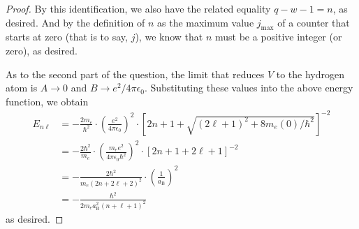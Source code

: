 \documentclass[../psets.tex]{subfiles}
\begin{document}
\begin{enumerate}
\begin{enumerate}
\begin{proof}
            By this identification, we also have the related equality $q-w-1=n$, as desired. And by the definition of $n$ as the maximum value $j_\text{max}$ of a counter that starts at zero (that is to say, $j$), we know that $n$ must be a positive integer (or zero), as desired.\par
            As to the second part of the question, the limit that reduces $V$ to the hydrogen atom is $A\to 0$ and $B\to e^2/4\pi\epsilon_0$. Substituting these values into the above energy function, we obtain
            \begin{align*}
                E_{n\ell} &= -\frac{2m_e}{\hbar^2}\cdot\left( \frac{e^2}{4\pi\epsilon_0} \right)^2\cdot\left[ 2n+1+\sqrt{(2\ell+1)^2+8m_e(0)/\hbar^2} \right]^{-2}\\
                &= -\frac{2\hbar^2}{m_e}\cdot\left( \frac{m_ee^2}{4\pi\epsilon_0\hbar^2} \right)^2\cdot\left[ 2n+1+2\ell+1 \right]^{-2}\\
                &= -\frac{2\hbar^2}{m_e(2n+2\ell+2)^2}\cdot\left( \frac{1}{a_\text{B}} \right)^2\\
                &= -\frac{\hbar^2}{2m_ea_\text{B}^2(n+\ell+1)^2}
            \end{align*}
            as desired.
        \end{proof}
    \end{enumerate}
\end{enumerate}
\end{document}
